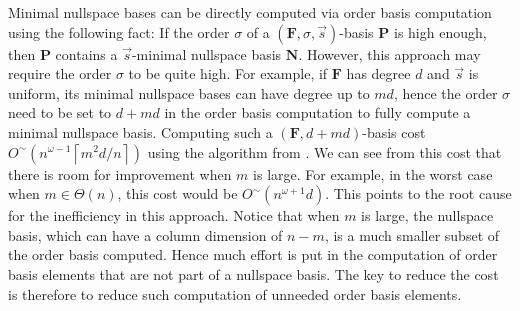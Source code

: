 Minimal nullspace bases can be directly computed via order basis computation
using the following fact: If the order $\sigma$ of a $\left(\mathbf{F},\sigma,\vec{s}\right)$-basis
$\mathbf{P}$ is high enough, then $\mathbf{P}$ contains a $\vec{s}$-minimal
nullspace basis $\mathbf{N}$. However, this approach may require
the order $\sigma$ to be quite high. For example, if $\mathbf{F}$
has degree $d$ and $\vec{s}$ is uniform, its minimal nullspace bases
can have degree up to $md$, hence the order $\sigma$ need to be
set to $d+md$ in the order basis computation to fully compute a minimal
nullspace basis. Computing such a $\left(\mathbf{F},d+md\right)$-basis
cost $O^{\sim}\left(n^{\omega-1}\left\lceil m^{2}d/n\right\rceil \right)$
using the algorithm from \citep{za2009}. We can see from this cost
that there is room for improvement when $m$ is large. For example,
in the worst case when $m\in\Theta\left(n\right)$, this cost would
be $O^{\sim}\left(n^{\omega+1}d\right)$. This points to the root
cause for the inefficiency in this approach. Notice that when $m$
is large, the nullspace basis, which can have a column dimension of
$n-m$, is a much smaller subset of the order basis computed. Hence
much effort is put in the computation of order basis elements that
are not part of a nullspace basis. The key to reduce the cost is therefore
to reduce such computation of unneeded order basis elements.

